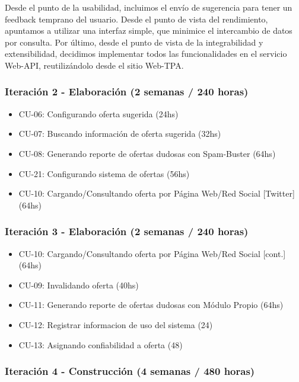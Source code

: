 	Desde el punto de la usabilidad, incluimos el env\'io de sugerencia para tener un feedback temprano del usuario. Desde el punto de vista del rendimiento, apuntamos a utilizar una interfaz simple, que minimice el intercambio de datos por consulta. Por \'ultimo, desde el punto de vista de la integrabilidad y extensibilidad, decidimos implementar todos las funcionalidades en el servicio Web-API, reutiliz\'andolo desde el sitio Web-TPA.
	
\subsubsection{Iteraci\'on 2 - Elaboraci\'on (2 semanas / 240 horas)}
	
	\begin{itemize}
	  \item CU-06: Configurando oferta sugerida (24hs)
	  \item CU-07: Buscando informaci\'on de oferta sugerida (32hs)
	  \item CU-08: Generando reporte de ofertas dudosas con Spam-Buster (64hs)
	  \item CU-21: Configurando sistema de ofertas (56hs)
	  \item CU-10: Cargando/Consultando oferta por P\'agina Web/Red Social [Twitter] (64hs)
	\end{itemize}

\subsubsection{Iteraci\'on 3 - Elaboraci\'on (2 semanas / 240 horas)}
	
	\begin{itemize}
		\item CU-10: Cargando/Consultando oferta por P\'agina Web/Red Social [cont.] (64hs)
		\item CU-09: Invalidando oferta (40hs)
		\item CU-11: Generando reporte de ofertas dudosas con M\'odulo Propio (64hs)
		\item CU-12: Registrar informacion de uso del sistema (24)
		\item CU-13: Asignando confiabilidad a oferta (48)
	\end{itemize}

\subsubsection{Iteraci\'on 4 - Construcci\'on (4 semanas / 480 horas)}
	
